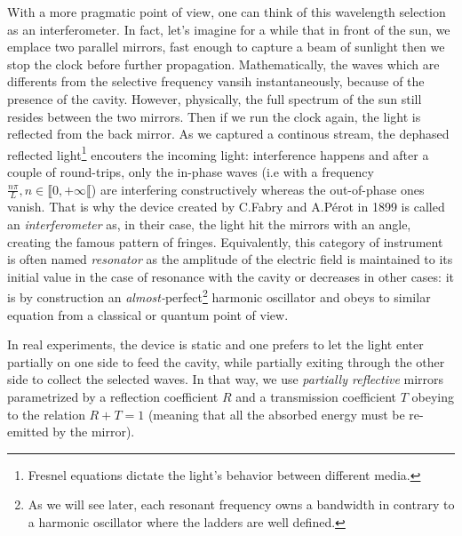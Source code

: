 \documentclass[10pt]{report}
\begin{document}
With a more pragmatic point of view, one can think of this wavelength selection as an interferometer. In fact, let's imagine for a while that in front of the sun, we emplace two parallel mirrors, fast enough to capture a beam of sunlight then we stop the clock before further propagation. Mathematically, the waves which are differents from the selective frequency vansih instantaneously, because of the presence of the cavity. However, physically, the full spectrum of the sun still resides between the two mirrors. Then if we run the clock again, the light is reflected from the back mirror. As we captured a continous stream, the dephased reflected light\footnote{Fresnel equations dictate the light's behavior between different media.} encouters the incoming light: interference happens and after a couple of round-trips, only the in-phase waves (i.e with a frequency $\frac{n\pi}{L}, n\in \llbracket 0, +\infty \llbracket $) are interfering constructively whereas the out-of-phase ones vanish. That is why the device created by C.Fabry and A.Pérot in 1899 is called an \textit{interferometer} as, in their case, the light hit the mirrors with an angle, creating the famous pattern of fringes. Equivalently, this category of instrument is often named \textit{resonator} as the amplitude of the electric field is maintained to its initial value in the case of resonance with the cavity or decreases in other cases: it is by construction an \textit{almost-}perfect\footnote{As we will see later, each resonant frequency owns a bandwidth in contrary to a harmonic oscillator where the ladders are well defined.} harmonic oscillator and obeys to similar equation from a classical or quantum point of view.

In real experiments, the device is static and one prefers to let the light enter partially on one side to feed the cavity, while partially exiting through the other side to collect the selected waves. In that way, we use \textit{partially reflective} mirrors parametrized by a reflection coefficient $R$ and a transmission coefficient $T$ obeying to the relation $R + T = 1$ (meaning that all the absorbed energy must be re-emitted by the mirror).
\end{document}
